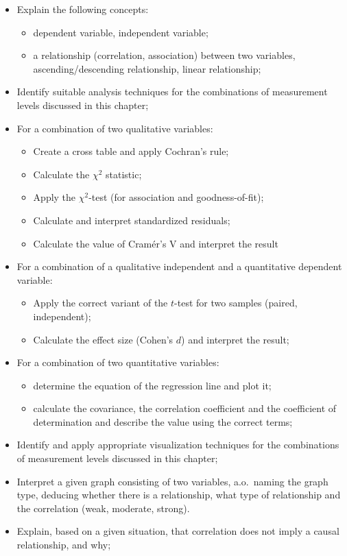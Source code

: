 \begin{itemize}
    \item Explain the following concepts:
    \begin{itemize}
        \item dependent variable, independent variable;
        \item a relationship (correlation, association) between two variables, ascending/descending relationship, linear relationship;
    \end{itemize}
    \item Identify suitable analysis techniques for the combinations of measurement levels discussed in this chapter;
    \item For a combination of two qualitative variables:
    \begin{itemize}
        \item Create a cross table and apply Cochran's rule;
        \item Calculate the $\chi^2$ statistic;
        \item Apply the $\chi^2$-test (for association and goodness-of-fit);
        \item Calculate and interpret standardized residuals;
        \item Calculate the value of Cramér's V and interpret the result
    \end{itemize}
    \item For a combination of a qualitative independent and a quantitative dependent variable:
    \begin{itemize}
        \item Apply the correct variant of the $t$-test for two samples (paired, independent);
        \item Calculate the effect size (Cohen's $d$) and interpret the result;
    \end{itemize}
    \item For a combination of two quantitative variables:
    \begin{itemize}
        \item determine the equation of the regression line and plot it;
        \item calculate the covariance, the correlation coefficient and the coefficient of determination and describe the value using the correct terms;
    \end{itemize}
    \item Identify and apply appropriate visualization techniques for the combinations of measurement levels discussed in this chapter;
    \item Interpret a given graph consisting of two variables, a.o.~naming the graph type, deducing whether there is a relationship, what type of relationship and the correlation (weak, moderate, strong).
    \item Explain, based on a given situation, that correlation does not imply a causal relationship, and why;
\end{itemize}


